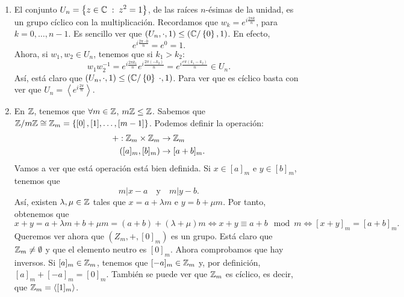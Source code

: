 \begin{eg}
\begin{enumerate}
	\item El conjunto $\displaystyle U_{n} = \left\{ z \in \mathbb{C} \; : \; z^{2} = 1\right\}  $, de las raíces $\displaystyle n $-ésimas de la unidad, es un grupo cíclico con la multiplicación. Recordamos que $\displaystyle w_{k} = e^{i\frac{2\pi k}{n}} $, para $\displaystyle k = 0, \ldots, n-1 $. Es sencillo ver que $\displaystyle \left(U_{n}, \cdot, 1\right) \leq \left(\mathbb{C} / \left\{ 0\right\} , 1\right) $. En efecto, 
		\[ e^{i\frac{2\pi \cdot 0}{n} } = e^{0} = 1 .\]
		Ahora, si $\displaystyle w_{1}, w_{2} \in U_{n} $, tenemos que si $\displaystyle k_{1} > k_{2} $:
		\[w_{1}w_{2}^{-1} = e^{i\frac{2\pi k_{1}}{n}}e^{i\frac{2\pi \left(-k_{2}\right)}{n}} = e^{i\frac{e\pi\left(k_{1}-k_{2}\right)}{n }}\in U_{n}.\]
		Así, está claro que $\displaystyle \left(U_{n}, \cdot , 1\right) \leq \left(\mathbb{C} / \left\{ 0\right\} \; \cdot , 1\right) $. Para ver que es cíclico basta con ver que $\displaystyle U_{n} = \left\langle e^{i\frac{2\pi }{n}} \right\rangle  $. 
	\item En $\displaystyle \mathbb{Z} $, tenemos que $\displaystyle \forall m \in \mathbb{Z} $, $\displaystyle m\mathbb{Z} \leq \mathbb{Z} $. Sabemos que $\displaystyle \mathbb{Z} / m\mathbb{Z} \cong \mathbb{Z}_{m} = \left\{ \left[0\right] , [1], \ldots, [m -1]\right\}  $. Podemos definir la operación:
	\[
	\begin{split}
		+ :	\mathbb{Z}_{m} \times \mathbb{Z}_{m} & \to \mathbb{Z}_{m} \\
		\left([a]_{m}, [b]_{m}\right) & \to [a + b]_{m}.
	\end{split}
	\]
	Vamos a ver que está operación está bien definida. Si $\displaystyle x \in [a]_{m} $ e $\displaystyle y \in [b]_{m} $, tenemos que 
	\[m | x - a \quad \text{y} \quad m | y - b .\]
	Así, existen $\displaystyle \lambda, \mu \in \mathbb{Z} $ tales que $\displaystyle x = a + \lambda m $ e $\displaystyle y = b + \mu m $. Por tanto, obtenemos que
	\[ x + y = a + \lambda m + b + \mu m = \left(a+b\right) + \left(\lambda + \mu\right)m \iff x + y \equiv a + b \mod m \iff [x +y]_{m} = [a + b]_{m} .\]
	Queremos ver ahora que $\displaystyle \left(Z_{m}, +, [0]_{m}\right) $ es un grupo. Está claro que $\displaystyle \mathbb{Z}_{m} \neq \emptyset $ y que el elemento neutro es $\displaystyle [0]_{m} $. Ahora comprobamos que hay inversos. Si $\displaystyle [a]_{m} \in \mathbb{Z}_{m} $, tenemos que $\displaystyle [-a]_{m} \in \mathbb{Z}_{m} $ y, por definición, $\displaystyle [a]_{m} + [-a]_{m} = [0]_{m} $. También se puede ver que $\displaystyle \mathbb{Z}_{m} $ es cíclico, es decir, que $\displaystyle \mathbb{Z}_{m} = \left\langle [1]_{m} \right\rangle  $.
\end{enumerate}
\end{eg}
